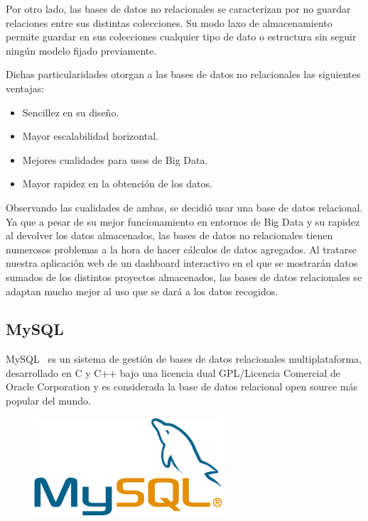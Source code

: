 \documentclass[a4paper, spanish, 12pt]{book}
\begin{document}
Por otro lado, las bases de datos no relacionales se caracterizan por no guardar
relaciones entre sus distintas colecciones. Su modo laxo de almacenamiento permite
guardar en sus colecciones cualquier tipo de dato o estructura sin seguir
ning\'un modelo fijado previamente.

Dichas particularidades otorgan a las bases de datos no relacionales las siguientes
ventajas:

\begin{itemize}

\item Sencillez en su dise\~no.

\item Mayor escalabilidad horizontal.

\item Mejores cualidades para usos de Big Data.

\item Mayor rapidez en la obtenci\'on de los datos.

\end{itemize}

Observando las cualidades de ambas, se decidi\'o usar una base de datos relacional.
Ya que a pesar de su mejor funcionamiento en entornos de Big Data y su rapidez al
devolver los datos almacenados, las bases de datos no relacionales tienen numerosos
problemas a la hora de hacer c\'alculos de datos agregados. Al tratarse nuestra
aplicaci\'on web de un dashboard interactivo en el que se mostrar\'an datos sumados de
los distintos proyectos almacenados, las bases de datos relacionales se adaptan mucho
mejor al uso que se dar\'a a los datos recogidos.

\subsection{MySQL}
\label{subsec:mysql}

MySQL~\cite{mysql} es un sistema de gesti\'on de bases de datos relacionales multiplataforma,
desarrollado en C y C++ bajo una licencia dual GPL/Licencia Comercial de Oracle
Corporation y es considerada la base de datos relacional open source m\'as popular del mundo.

\begin{figure}[H]
  \centering
  \includegraphics[width=7cm, keepaspectratio]{img/mysql-logo}
\end{figure}
\end{document}
